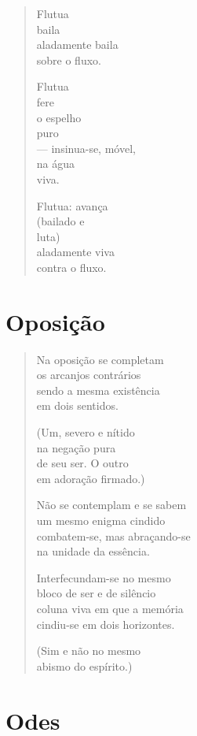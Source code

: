 \begin{verse}
Flutua\\
baila\\
aladamente baila\\
sobre o fluxo.

Flutua\\
fere\\
o espelho\\
puro\\
--- insinua-se, móvel,\\
na água\\
viva.

Flutua: avança\\
(bailado e\\
luta)\\
aladamente viva\\
contra o fluxo.
\end{verse}

\chapter{Oposição}

\begin{verse}
Na oposição se completam\\
os arcanjos contrários\\
sendo a mesma existência\\
em dois sentidos.

(Um, severo e nítido\\
na negação pura\\
de seu ser. O outro\\
em adoração firmado.)

Não se contemplam e se sabem\\
um mesmo enigma cindido\\
combatem-se, mas abraçando-se\\
na unidade da essência.

Interfecundam-se no mesmo\\
bloco de ser e de silêncio\\
coluna viva em que a memória\\
cindiu-se em dois horizontes.

(Sim e não no mesmo\\
abismo do espírito.)
\end{verse}

\chapter{Odes}

